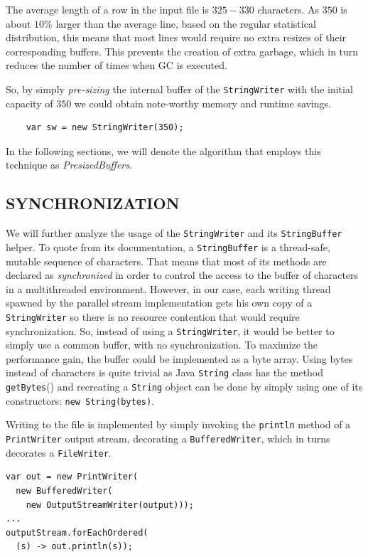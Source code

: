 \documentclass[a4paper,twoside]{article}
\begin{document}
The average length of a row in the input file is $325 - 330$ characters.
As $350$ is about $10\%$ larger than the average line, based on the regular statistical distribution, this means that most lines would require no extra resizes of their corresponding buffers. This prevents the creation of extra garbage, which in turn reduces the number of times when GC is executed.

So, by simply {\it pre-sizing} the internal buffer of the \texttt{StringWriter} with the initial capacity of $350$ we could obtain note-worthy memory and runtime savings. 
\begin{verbatim}
    var sw = new StringWriter(350);
\end{verbatim}
In the following sections, we will denote the algorithm that employs this technique as {\it PresizedBuffers}.



\subsection{\uppercase{Synchronization}}
\label{io:sync}

We will further analyze the usage of the \texttt{StringWriter} and its \texttt{StringBuffer} helper.
To quote from its documentation, a {\texttt{StringBuffer}} is  a thread-safe, mutable sequence of characters.
That means that most of its methods are declared as {\textit{synchronized}} in order to control the access to the buffer of characters in a multithreaded environment.
However, in our case, each writing thread spawned by the parallel stream implementation gets his own copy of a {\texttt{StringWriter}} so there is no resource contention that would require synchronization.
So, instead of using a {\texttt{StringWriter}}, it would be better to simply use a common buffer, with no synchronization.
To maximize the performance gain, the buffer could be implemented as a byte array.
Using bytes instead of characters is quite trivial as Java {\texttt{String}} class has the method {\texttt{getBytes}()} and recreating a {\texttt{String}} object can be done by simply using one of its constructors: {\texttt{new String(bytes)}}.

Writing to the file is implemented by simply invoking the {\texttt{println}} method of a {\texttt{PrintWriter}} output stream, decorating a {\texttt{BufferedWriter}}, which in turns decorates a {\texttt{FileWriter}}.
\begin{verbatim}
var out = new PrintWriter(
  new BufferedWriter(
    new OutputStreamWriter(output)));
...    
outputStream.forEachOrdered(
  (s) -> out.println(s));
\end{verbatim}
\end{document}
